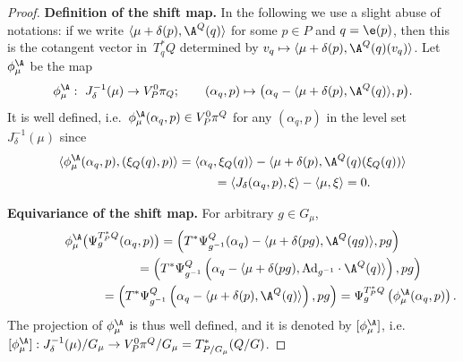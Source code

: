 \begin{proof}
{\bf Def\/inition of the shift map.} In the following we use a slight abuse of notations: if we write $\langle \mu+\delta(p),\A^Q(q)\rangle$ for some $p\in P$ and $q=\e(p)$, then this is the cotangent vector in~$T_q^*Q$ determined by $v_q\mapsto \langle \mu+\delta(p),\A^Q(q)(v_q)\rangle$. Let $\phi_\mu^{\A}$ be the map
\[\phi_\mu^\A:\ J_\delta^{-1}(\mu) \to V^0_P\pi_Q; \qquad (\alpha_q,p) \mapsto \big(\alpha_q-\langle \mu+\delta(p),\A^Q(q)\rangle,p\big).\] It is well def\/ined, i.e.\ $\phi^\A_\mu(\alpha_q,p)\in V^0_P\pi^Q$ for any $(\alpha_q,p)$ in the level set $J_\delta^{-1}(\mu)$ since
\begin{gather*}
\langle \phi_\mu^{\A}(\alpha_q,p),(\xi_Q(q),p)\rangle   = \langle \alpha_q, \xi_Q(q)\rangle - \langle \mu+\delta(p),\A^Q(q)(\xi_Q(q))\rangle \\
 \phantom{\langle \phi_\mu^{\A}(\alpha_q,p),(\xi_Q(q),p)\rangle}= \langle J_\delta(\alpha_q,p),\xi\rangle - \langle \mu,\xi\rangle =0.
 \end{gather*}

{\bf Equivariance of the shift map.} For arbitrary $g\in G_\mu$, \begin{gather*}
\phi_\mu^{\A}\big(\Psi^{T_P^*Q}_g(\alpha_q,p)\big)  = \left(T^*\Psi^{Q}_{g^{-1}}(\alpha_q) - \langle \mu+\delta(pg) , \A^Q (qg) \rangle ,pg\right)\\
\phantom{\phi_\mu^{\A}(\Psi^{T_P^*Q}_g(\alpha_q,p))}{}
=  \left(T^*\Psi^{Q}_{g^{-1}}\left(\alpha_q - \langle \mu+\delta(pg) , {\rm Ad}_{g^{-1}}\cdot \A^Q(q)\rangle\right),pg\right)\\
\phantom{\phi_\mu^{\A}(\Psi^{T_P^*Q}_g(\alpha_q,p))}{}
= \left( T^*\Psi^{Q}_{g^{-1}}\left(\alpha_q - \langle \mu+\delta(p),\A^Q(q)\rangle\right),pg\right) = \Psi^{T_P^*Q}_g\left(\phi^\A_\mu(\alpha_q,p)\right).
\end{gather*}The projection of $\phi_\mu^{\A}$ is thus well def\/ined, and it is denoted by $[\phi_\mu^\A]$, i.e.\ $[\phi_\mu^\A]:J^{-1}_\delta(\mu)/G_\mu \to V^0_P \pi^Q/G_\mu=T^*_{P/G_\mu}(Q/G)$.
 \end{proof}

